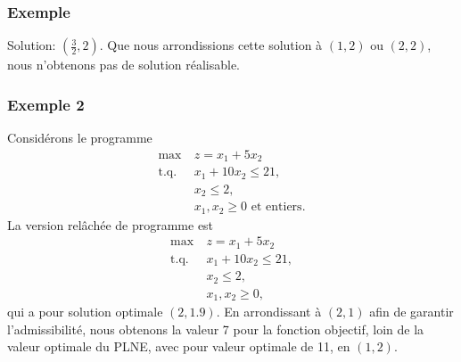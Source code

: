 \documentclass[usepdftitle=false, aspectratio=169]{beamer}
\def\st{\mbox{t.q. }}
\begin{document}
\begin{frame}
\frametitle{Exemple}

Solution: $\left( \frac{3}{2},2\right)$. Que nous arrondissions cette solution à $(1,2)$ ou $(2,2)$, nous n'obtenons pas de solution réalisable.
\begin{center}
\end{center}

\end{frame}

\begin{frame}
\frametitle{Exemple 2}

Considérons le programme
\begin{align*}
\max\ & z = x_1+5x_2\\
\st & x_1+10x_2 \leq 21, \\
& x_2 \leq 2, \\
& x_1, x_2 \geq 0 \mbox{ et entiers}.
\end{align*}
La version relâchée de programme est
\begin{align*}
\max\ & z = x_1+5x_2\\
\st & x_1+10x_2 \leq 21, \\
& x_2 \leq 2, \\
& x_1, x_2 \geq 0,
\end{align*}
qui a pour solution optimale $(2, 1.9)$. En arrondissant à $(2,1)$ afin de garantir l'admissibilité, nous obtenons la valeur 7 pour la fonction objectif, loin de la valeur optimale du PLNE, avec pour valeur optimale de 11, en $(1,2)$.

\end{frame}
\end{document}
